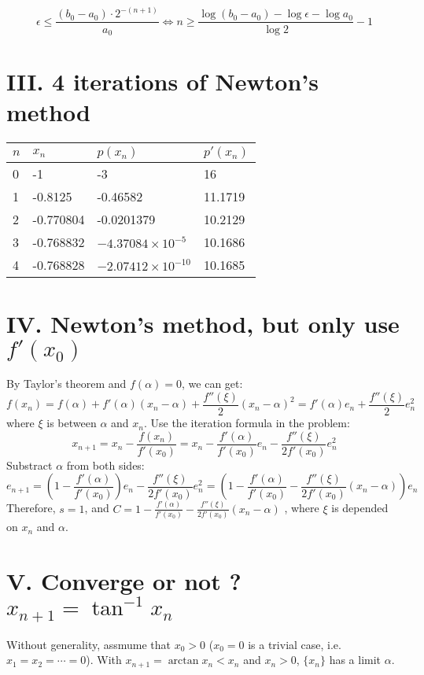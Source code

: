 \documentclass[a4paper]{article}
\begin{document}
$$
\epsilon \leq \frac{(b_0-a_0)\cdot 2^{-(n+1)}}{a_0} \Leftrightarrow n \geq \frac{\log(b_0-a_0)-\log\epsilon-\log a_0}{\log 2} - 1
$$

\section*{III. 4 iterations of Newton's method}

\begin{table}[!ht]
  \centering
  \begin{tabular}{|l|l|l|l|}
  \hline
      $n$ & $x_n$ & $p(x_n)$ & $p'(x_n)$ \\ \hline
      0 & -1 & -3 & 16 \\ \hline
      1 & -0.8125 & -0.46582 & 11.1719 \\ \hline
      2 & -0.770804 & -0.0201379 & 10.2129 \\ \hline
      3 & -0.768832 & $-4.37084\times 10^{-5}$ & 10.1686 \\ \hline
      4 & -0.768828 & $-2.07412\times 10^{-10}$ & 10.1685 \\ \hline
  \end{tabular}
\end{table}

\section*{IV. Newton's method, but only use $f'(x_0)$}
By Taylor's theorem and $f(\alpha) = 0$, we can get:
$$
f(x_n) = f(\alpha) + f'(\alpha)(x_n - \alpha) + \frac{f''(\xi)}{2}(x_n - \alpha)^2 = f'(\alpha)e_n+ \frac{f''(\xi)}{2}e_n^2
$$
where $\xi$ is between $\alpha$ and $x_n$.
Use the iteration formula in the problem:
$$
x_{n+1} = x_n - \frac{f(x_n)}{f'(x_0)} = x_n - \frac{f'(\alpha)}{f'(x_0)}e_n -\frac{f''(\xi)}{2f'(x_0)}e_n^2
$$
Substract $\alpha$ from both sides:
$$
e_{n+1} = (1 - \frac{f'(\alpha)}{f'(x_0)})e_n -\frac{f''(\xi)}{2f'(x_0)}e_n^2 = (1 - \frac{f'(\alpha)}{f'(x_0)} - \frac{f''(\xi)}{2f'(x_0)}(x_n-\alpha))e_n
$$
Therefore, $s=1$, and $C = 1 - \frac{f'(\alpha)}{f'(x_0)} - \frac{f''(\xi)}{2f'(x_0)}(x_n-\alpha)$ , where $\xi$ is depended on $x_n$ and $\alpha$.

\section*{V. Converge or not ? $x_{n+1} = \tan^{-1}x_n$}
Without generality, assmume that $x_0 > 0$ ($x_0 = 0$ is a trivial case, i.e. $x_1 = x_2 = \cdots = 0$). With $x_{n+1} = \arctan{x_n} < x_n$ and $x_n > 0$, $ \{ x_n \}$ has a limit $\alpha$.
\end{document}
